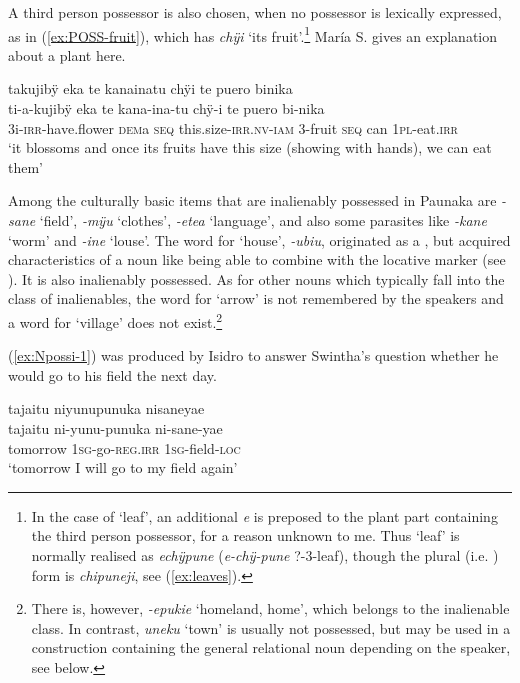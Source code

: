 A third person possessor is also chosen, when no possessor is lexically expressed, as in (\ref{ex:POSS-fruit}), which has \textit{chÿi} ‘its fruit’.\footnote{In the case of ‘leaf’, an additional \textit{e} is preposed to the plant part containing the third person possessor, for a reason unknown to me. Thus ‘leaf’ is normally realised as \textit{echÿpune} (\textit{e-chÿ-pune} ?-3-leaf), though the plural (i.e. ) form is \textit{chipuneji}, see (\ref{ex:leaves}).} María S. gives an explanation about a plant here.

\ea\label{ex:POSS-fruit}
\begingl 
\glpreamble takujibÿ eka te kanainatu chÿi te puero binika\\
\gla ti-a-kujibÿ eka te kana-ina-tu chÿ-i te puero bi-nika\\ 
\glb 3i-\textsc{irr}-have.flower \textsc{dem}a \textsc{seq} this.size-\textsc{irr.nv}-\textsc{iam} 3-fruit \textsc{seq} can 1\textsc{pl}-eat.\textsc{irr}\\ 
\glft ‘it blossoms and once its fruits have this size (showing with hands), we can eat them’
\trailingcitation{[rxx-e121126s-3.16]}
\xe
{}


Among the culturally basic items that are inalienably possessed in Paunaka are \textit{-sane} ‘field’, \textit{-mÿu} ‘clothes’, \textit{-etea} ‘language’, and also some parasites like \textit{-kane} ‘worm’ and \textit{-ine} ‘louse’. The word for ‘house’, \textit{-ubiu}, originated as a , but acquired characteristics of a noun like being able to combine with the locative marker (see ). It is also inalienably possessed. As for other nouns which typically fall into the class of inalienables, the word for ‘arrow’ is not remembered by the speakers and a word for ‘village’ does not exist.\footnote{There is, however, \textit{-epukie} ‘homeland, home’, which belongs to the inalienable class. In contrast, \textit{uneku} ‘town’ is usually not possessed, but may be used in a construction containing the general relational noun depending on the speaker, see  below.}

(\ref{ex:Npossi-1}) was produced by Isidro to answer Swintha’s question whether he would go to his field the next day.

\ea\label{ex:Npossi-1}
\begingl
\glpreamble tajaitu niyunupunuka nisaneyae\\
\gla tajaitu ni-yunu-punuka ni-sane-yae\\
\glb tomorrow 1\textsc{sg}-go-\textsc{reg.irr} 1\textsc{sg}-field-\textsc{loc}\\
\glft ‘tomorrow I will go to my field again’
\endgl
\trailingcitation{[dxx-d120416s.129]}
\xe

